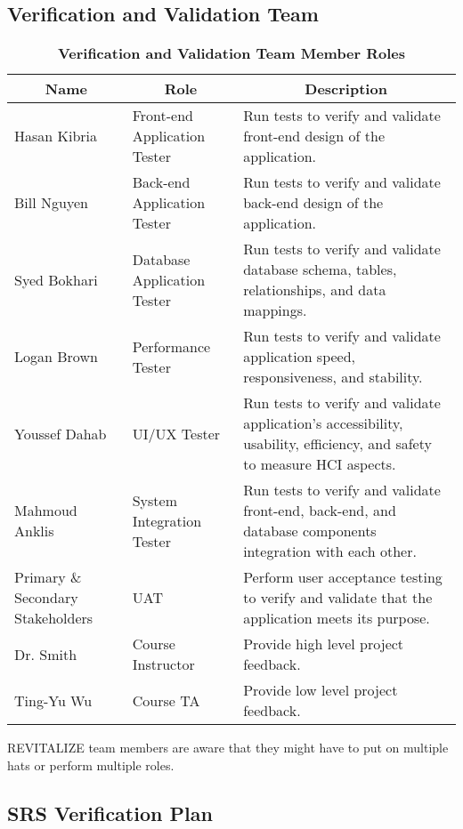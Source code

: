 \documentclass[12pt, titlepage]{article}
\begin{document}
\subsection{Verification and Validation Team}

\begin{table}[H]
	\centering
	\caption{\textbf{Verification and Validation Team Member Roles}}
	\begin{tabular}{|p{3cm}|p{4cm}|p{7cm}|}
		\hline
		\multicolumn{1}{|c|}{\textbf{Name}} & \multicolumn{1}{|c|}{\textbf{Role}} & \multicolumn{1}{|c|}{\textbf{Description}}
		\\ \hline
		Hasan Kibria & Front-end Application Tester & Run tests to verify and validate front-end design of the application.
		\\ \hline
		Bill Nguyen & Back-end Application Tester & Run tests to verify and validate back-end design of the application.
		\\ \hline
		Syed Bokhari & Database Application Tester & Run tests to verify and validate database schema, tables, relationships, and data mappings. 
		\\ \hline
		Logan Brown & Performance Tester & Run tests to verify and validate application speed, responsiveness, and stability.
		\\ \hline
		Youssef Dahab & UI/UX Tester & Run tests to verify and validate application's accessibility, usability, efficiency, and safety to measure HCI aspects.
		\\ \hline  
		Mahmoud Anklis & System Integration Tester & Run tests to verify and validate front-end, back-end, and database components integration with each other.
		\\ \hline
		Primary \& Secondary Stakeholders & UAT & Perform user acceptance testing to verify and validate that the application meets its purpose.
		\\ \hline
		Dr. Smith & Course Instructor & Provide high level project feedback.
		\\ \hline
		Ting-Yu Wu & Course TA & Provide low level project feedback.
		\\ \hline
	\end{tabular}
\end{table}

REVITALIZE team members are aware that they might have to put on multiple hats or perform multiple roles.

\subsection{SRS Verification Plan}
\end{document}

